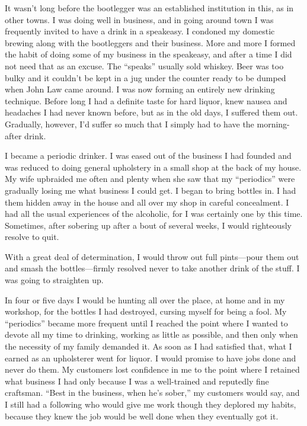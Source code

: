 It wasn’t long before the bootlegger was an established institution in this, as in other towns. I was doing well in business, and in going around town I was frequently invited to have a drink in a speakeasy. I condoned my domestic brewing along with the bootleggers and their business. More and more I formed the habit of doing some of my business in the speakeasy, and after a time I did not need that as an excuse. The “speaks” usually sold whiskey. Beer was too bulky and it couldn’t be kept in a jug under the counter ready to be dumped when John Law came around. I was now forming an entirely new drinking technique. Before long I had a definite taste for hard liquor, knew nausea and headaches I had never known before, but as in the old days, I suffered them out. Gradually, however, I’d suffer so much that I simply had to have the morning-after drink.

I became a periodic drinker. I was eased out of the business I had founded and was reduced to doing general upholstery in a small shop at the back of my house. My wife upbraided me often and plenty when she saw that my “periodics” were gradually losing me what business I could get. I began to bring bottles in. I had them hidden away in the house and all over my shop in careful concealment. I had all the usual experiences of the alcoholic, for I was certainly one by this time. Sometimes, after sobering up after a bout of several weeks, I would righteously resolve to quit.

With a great deal of determination, I would throw out full pints—pour them out and smash the bottles—firmly resolved never to take another drink of the stuff. I was going to straighten up.

In four or five days I would be hunting all over the place, at home and in my workshop, for the bottles I had destroyed, cursing myself for being a fool. My “periodics” became more frequent until I reached the point where I wanted to devote all my time to drinking, working as little as possible, and then only when the necessity of my family demanded it. As soon as I had satisfied that, what I earned as an upholsterer went for liquor. I would promise to have jobs done and never do them. My customers lost confidence in me to the point where I retained what business I had only because I was a well-trained and reputedly fine craftsman. “Best in the business, when he’s sober,” my customers would say, and I still had a following who would give me work though they deplored my habits, because they knew the job would be well done when they eventually got it.

